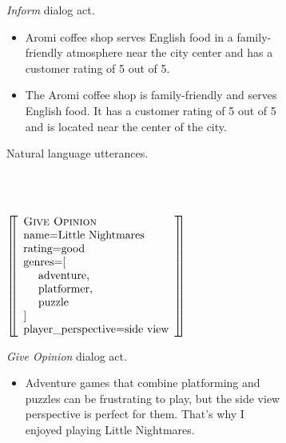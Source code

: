 \begin{figure}[p]
\center
\begin{subfigure}{.35\textwidth}
\center
{}
    {}
    {}
    {}
    {}
    {}
    {}
 
\caption{\emph{Inform} dialog act.}\label{fig:informexample}
\end{subfigure}\hfill \begin{subfigure}{.58\textwidth}
\begin{itemize}
\item Aromi coffee shop serves English food in a family-friendly atmosphere near the city center and has a customer rating of 5 out of 5.
\item The Aromi coffee shop is family-friendly and serves English food.  It has a customer rating of 5 out of 5 and is located near the center of the city.
\end{itemize}
\caption{Natural language utterances.}
\label{fig:mr1utt}
\end{subfigure}



~\\~\\

\begin{subfigure}{.35\textwidth}
\center
$\left[\!\!\left[\begin{array}{l} 
    \textsc{Give Opinion} \\ 
    \textrm{name=Little Nightmares} \\
    \textrm{rating=good} \\
    \textrm{genres=[}\\
    \textrm{~~~~adventure,} \\
    \textrm{~~~~platformer,}\\
    \textrm{~~~~puzzle} \\
    \textrm{]} \\
    \textrm{player\_perspective=side view}
\end{array}\right]\!\!\right]$ 
\caption{\emph{Give Opinion} dialog act.}\label{fig:giveopinionexample}
\end{subfigure}\hfill \begin{subfigure}{.58\textwidth}
\begin{itemize}
    \item Adventure games that combine platforming and puzzles can be frustrating to play, but the side view perspective is perfect for them. That's why I enjoyed playing Little Nightmares.


\end{itemize}
\end{subfigure}
\end{figure}

